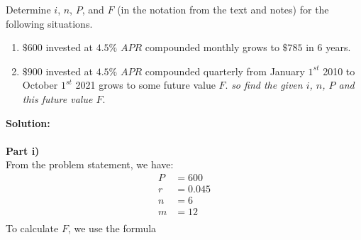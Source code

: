 







\maketitle
\newpage
\begin{homeworkProblem}
    Determine $i$, $n$, $P$, and $F$ (in the notation from the text and notes) for the following situations.
    \begin{enumerate}[label=\roman*)]
        \item $\$600$ invested at $4.5\%$ $APR$ compounded monthly grows to $\$785$ in $6$ years.
        \item $\$900$ invested at $4.5\%$ $APR$ compounded quarterly from January $1^{st}$ 2010 to October $1^{st}$ 2021 grows to some future value $F$. \textit{so find the given $i$, $n$, $P$ and this future value $F$}.
    \end{enumerate}
\begin{mdframed}
    \textbf{Solution:}
    \\ \\
    \textbf{Part i)} 
    \\
    From the problem statement, we have:
    \begin{align*}
        P &= 600 \\
        r &= 0.045 \\
        n &= 6  \\
        m &= 12 \\
    \end{align*}
    To calculate $F$, we use the formula
\end{mdframed}
\end{homeworkProblem}

